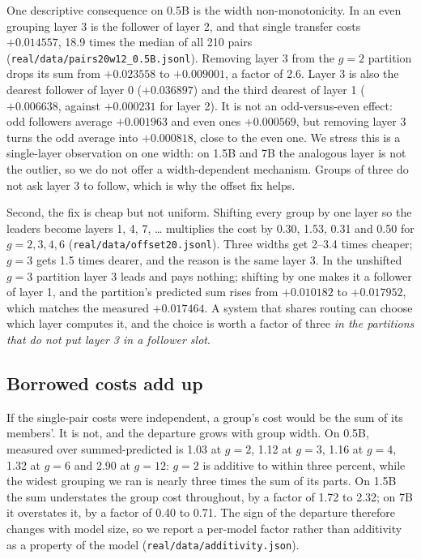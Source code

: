\documentclass[10pt]{article}
\begin{document}
One descriptive consequence on 0.5B is the width non-monotonicity. In an even
grouping layer 3 is the follower of layer 2, and that single transfer costs
$+0.014557$, 18.9 times the median of all 210 pairs
(\texttt{real/data/pairs20w12\_0.5B.jsonl}). Removing layer 3 from the
$g{=}2$ partition drops its sum from $+0.023558$ to $+0.009001$, a factor of
2.6. Layer 3 is also the dearest follower of layer 0 ($+0.036897$) and the
third dearest of layer 1 ($+0.006638$, against $+0.000231$ for layer 2).
It is not an odd-versus-even effect: odd followers average $+0.001963$ and
even ones $+0.000569$, but removing layer 3 turns the odd average into
$+0.000818$, close to the even one. We stress this is a single-layer
observation on one width: on 1.5B and 7B the analogous layer is not the
outlier, so we do not offer a width-dependent mechanism. Groups of three do
not ask layer 3 to follow, which is why the offset fix helps.

Second, the fix is cheap but not uniform. Shifting every group by one
layer so the leaders become layers 1, 4, 7, \ldots{} multiplies the cost by
0.30, 1.53, 0.31 and 0.50 for $g{=}2,3,4,6$
(\texttt{real/data/offset20.jsonl}). Three widths get 2--3.4 times cheaper;
$g{=}3$ gets 1.5 times dearer, and the reason is the same layer 3. In the
unshifted $g{=}3$ partition layer 3 leads and pays nothing; shifting by one
makes it a follower of layer 1, and the partition's predicted sum rises from
$+0.010182$ to $+0.017952$, which matches the measured $+0.017464$. A system
that shares routing can choose which layer computes it, and the choice is
worth a factor of three \emph{in the partitions that do not put layer 3 in a
follower slot}.

\subsection{Borrowed costs add up}

If the single-pair costs were independent, a group's cost would be the sum
of its members'. It is not, and the departure grows with group width. On
0.5B, measured over summed-predicted is 1.03 at $g{=}2$, 1.12 at $g{=}3$,
1.16 at $g{=}4$, 1.32 at $g{=}6$ and 2.90 at $g{=}12$: $g{=}2$ is additive
to within three percent, while the widest grouping we ran is nearly three
times the sum of its parts. On 1.5B the sum understates the group cost
throughout, by a factor of 1.72 to 2.32; on 7B it overstates it, by a factor
of 0.40 to 0.71. The sign of the departure therefore changes with model
size, so we report a per-model factor rather than additivity as a property
of the model (\texttt{real/data/additivity.json}).
\end{document}
